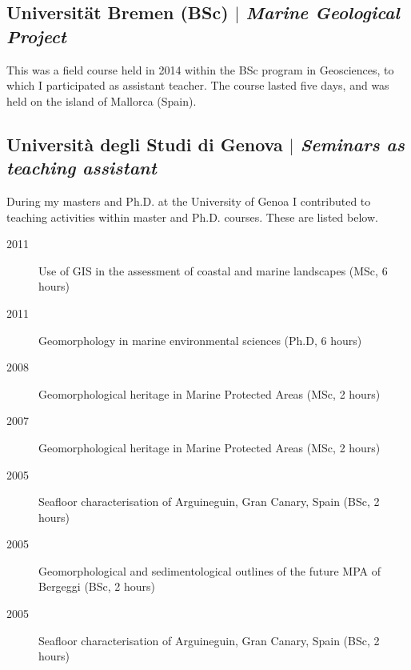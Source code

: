 \documentclass[11pt]{article}
\begin{document}
\subsection{Universität Bremen (BSc) $|$ {\normalfont\textit{Marine Geological Project}}}
{\footnotesize This was a field course held in 2014 within the BSc program in Geosciences, to which I participated as assistant teacher. The course lasted five days, and was held on the island of Mallorca (Spain).}
\bigskip

\subsection{Università degli Studi di Genova $|$ {\normalfont\textit{Seminars as teaching assistant}}}
{\footnotesize During my masters and Ph.D. at the University of Genoa I contributed to teaching activities within master and Ph.D. courses. These are listed below.}

{\footnotesize 
\begin{description}
  \item [2011] Use of GIS in the assessment of coastal and marine landscapes (MSc, 6 hours)
  \item [2011] Geomorphology in marine environmental sciences (Ph.D, 6 hours)
  \item [2008] Geomorphological heritage in Marine Protected Areas (MSc, 2 hours)
  \item [2007] Geomorphological heritage in Marine Protected Areas (MSc, 2 hours)
  \item [2005] Seafloor characterisation of Arguineguin, Gran Canary, Spain (BSc, 2 hours)
  \item [2005] Geomorphological and sedimentological outlines of the future MPA of Bergeggi (BSc, 2 hours)
  \item [2005] Seafloor characterisation of Arguineguin, Gran Canary, Spain (BSc, 2 hours)
\end{description}
}
\end{document}
